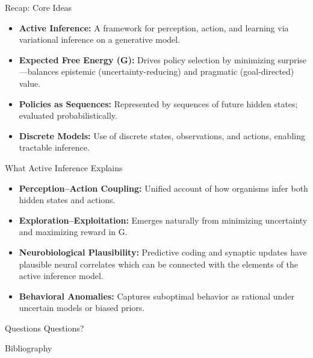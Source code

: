 \documentclass[aspectratio=1610, english]{beamer}
\begin{document}
\begin{frame}{Recap: Core Ideas}
\begin{itemize}
  \item \textbf{Active Inference:} A framework for perception, action, and learning via variational inference on a generative model.
  \item \textbf{Expected Free Energy (G):} Drives policy selection by minimizing surprise—balances epistemic (uncertainty-reducing) and pragmatic (goal-directed) value.
  \item \textbf{Policies as Sequences:} Represented by sequences of future hidden states; evaluated probabilistically.
  \item \textbf{Discrete Models:} Use of discrete states, observations, and actions, enabling tractable inference.
\end{itemize}
\end{frame}

\begin{frame}{What Active Inference Explains}
\begin{itemize}
  \item \textbf{Perception–Action Coupling:} Unified account of how organisms infer both hidden states and actions.
  \item \textbf{Exploration–Exploitation:} Emerges naturally from minimizing uncertainty and maximizing reward in G.
  \item \textbf{Neurobiological Plausibility:} Predictive coding and synaptic updates have plausible neural correlates which can be connected with the elements of the active inference model.
  \item \textbf{Behavioral Anomalies:} Captures suboptimal behavior as rational under uncertain models or biased priors.
\end{itemize}
\end{frame}

\begin{frame}{Questions}
    \centering
    \Huge
    Questions?
\end{frame}

\begin{frame}{Bibliography}
{}

\end{frame}
\end{document}
